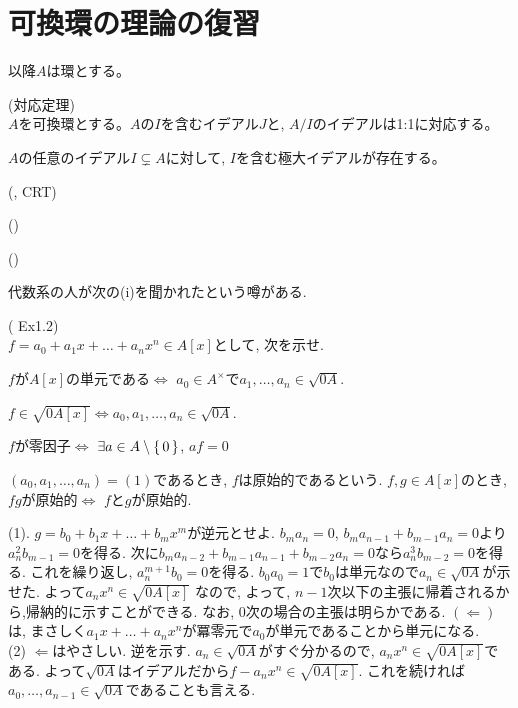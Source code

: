 \section{可換環の理論の復習}
以降$A$は環とする。
\begin{prop} (対応定理)\\
$A$を可換環とする。$A$の$I$を含むイデアル$J$と, $A/I$のイデアルは1:1に対応する。
\end{prop}
\begin{prop}
$A$の任意のイデアル$I\subsetneq A$に対して, $I$を含む極大イデアルが存在する。
\end{prop}



\begin{theo} (, CRT)

\end{theo}
\begin{theo} ()

\end{theo}

\begin{theo} ()

\end{theo}

\begin{theo}

\end{theo}



代数系の人が次の(i)を聞かれたという噂がある.
\begin{egprob} (\cite{atimac} Ex1.2) \\
$f=a_0+a_1x+\dots +a_nx^n\in A[x]$として, 次を示せ.
\ben
\item $f$が$A[x]$の単元である$\iff$ $a_0\in A^{\times}$で$a_1,\dots, a_n \in \sqrt{0A}$.
\item $f\in \sqrt{0A[x]} \iff a_0,a_1,\dots, a_n \in \sqrt{0A}$.
\item $f$が零因子$\iff$ $\exists a\in A\setminus{\set{0}}$, $af = 0$
\item $(a_0,a_1,\dots, a_n) = (1)$であるとき, $f$は原始的であるという. $f,g\in A[x]$のとき, $fg$が原始的$\iff$ $f$と$g$が原始的.
\een
\end{egprob}
\begin{egans}
(1). $g=b_0 + b_1x + \dots + b_mx^m$が逆元とせよ. $b_ma_n = 0$, $b_{m}a_{n-1} + b_{m-1}a_n = 0$より$a_{n}^2 b_{m-1} = 0$を得る. 次に$b_{m}a_{n-2} + b_{m-1}a_{n-1} + b_{m-2}a_{n} = 0$なら$a_{n}^3 b_{m-2} = 0$を得る.  これを繰り返し, $a_{n}^{m+1}b_{0} = 0$を得る. $b_0a_0 = 1$で$b_0$は単元なので$a_{n}\in \sqrt{0A}$が示せた. よって$a_{n}x^n \in \sqrt{0A[x]}$ なので,  よって, $n-1$次以下の主張に帰着されるから,帰納的に示すことができる. なお, $0$次の場合の主張は明らかである. $(\Leftarrow)$は, まさしく$a_1x+\dots + a_nx^n$が冪零元で$a_0$が単元であることから単元になる. \\
(2) $\Leftarrow$はやさしい. 逆を示す. $a_n\in \sqrt{0A}$がすぐ分かるので, $a_{n}x^n\in \sqrt{0A[x]}$である. よって$\sqrt{0A}$はイデアルだから$f-a_nx^n\in \sqrt{0A[x]}$. これを続ければ$a_{0},\dots, a_{n-1}\in \sqrt{0A}$であることも言える.
\end{egans}


